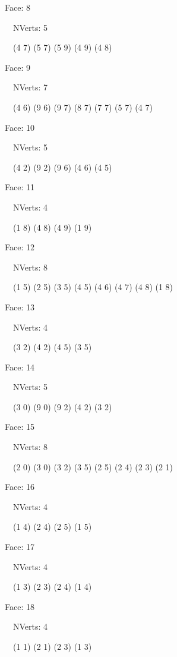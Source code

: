 \documentclass{article}
\begin{document}
{\footnotesize 

Face: 8

\   \    NVerts: 5

 \   \   (4 7) (5 7) (5 9) (4 9) (4 8)}

{\footnotesize 

Face: 9

\   \    NVerts: 7

 \   \   (4 6) (9 6) (9 7) (8 7) (7 7) (5 7) (4 7)}

{\footnotesize 

Face: 10

\   \    NVerts: 5

 \   \   (4 2) (9 2) (9 6) (4 6) (4 5)}

{\footnotesize 

Face: 11

\   \    NVerts: 4

 \   \   (1 8) (4 8) (4 9) (1 9)}

{\footnotesize 

Face: 12

\   \    NVerts: 8

 \   \   (1 5) (2 5) (3 5) (4 5) (4 6) (4 7) (4 8) (1 8)}

{\footnotesize 

Face: 13

\   \    NVerts: 4

 \   \   (3 2) (4 2) (4 5) (3 5)}

{\footnotesize 

Face: 14

\   \    NVerts: 5

 \   \   (3 0) (9 0) (9 2) (4 2) (3 2)}

{\footnotesize 

Face: 15

\   \    NVerts: 8

 \   \   (2 0) (3 0) (3 2) (3 5) (2 5) (2 4) (2 3) (2 1)}

{\footnotesize 

Face: 16

\   \    NVerts: 4

 \   \   (1 4) (2 4) (2 5) (1 5)}

{\footnotesize 

Face: 17

\   \    NVerts: 4

 \   \   (1 3) (2 3) (2 4) (1 4)}

{\footnotesize 

Face: 18

\   \    NVerts: 4

 \   \   (1 1) (2 1) (2 3) (1 3)}
\end{document}
